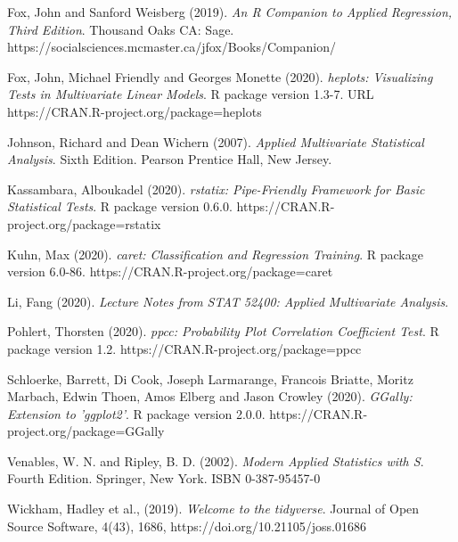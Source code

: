 \newpage
\begin{thebibliography}{}

Fox, John and Sanford Weisberg (2019). 
\textit{An R Companion to Applied Regression, Third Edition}. 
Thousand Oaks CA: Sage. https://socialsciences.mcmaster.ca/jfox/Books/Companion/

Fox, John, Michael Friendly and Georges Monette (2020). 
\textit{heplots: Visualizing Tests in Multivariate Linear Models}. 
R package version 1.3-7. URL https://CRAN.R-project.org/package=heplots

Johnson, Richard and Dean Wichern (2007).
\textit{Applied Multivariate Statistical Analysis}.
Sixth Edition. Pearson Prentice Hall, New Jersey.

Kassambara, Alboukadel (2020). 
\textit{rstatix: Pipe-Friendly Framework for Basic Statistical Tests}. 
R package version 0.6.0. https://CRAN.R-project.org/package=rstatix

Kuhn, Max (2020). 
\textit{caret: Classification and Regression Training}. 
R package version 6.0-86. https://CRAN.R-project.org/package=caret

Li, Fang (2020).
\textit{Lecture Notes from STAT 52400: Applied Multivariate Analysis}.

Pohlert, Thorsten (2020). 
\textit{ppcc: Probability Plot Correlation Coefficient Test}.
R package version 1.2. https://CRAN.R-project.org/package=ppcc

Schloerke, Barrett, Di Cook, Joseph Larmarange, Francois Briatte, Moritz Marbach, Edwin Thoen, Amos Elberg and Jason Crowley (2020). 
\textit{GGally: Extension to 'ggplot2'}. 
R package version 2.0.0. https://CRAN.R-project.org/package=GGally

Venables, W. N. and Ripley, B. D. (2002). 
\textit{Modern Applied Statistics with S}.
Fourth Edition. Springer, New York. ISBN 0-387-95457-0

Wickham, Hadley et al., (2019).
\textit{Welcome to the tidyverse}. 
Journal of Open Source Software, 4(43), 1686, https://doi.org/10.21105/joss.01686

\end{thebibliography}


